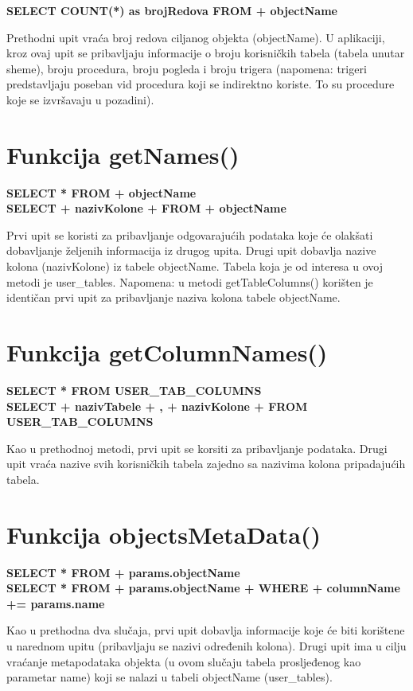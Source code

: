 \documentclass[12pt, a4paper]{report}
\theoremstyle{definition}
\begin{document}
	\textbf{SELECT COUNT(*) as brojRedova FROM + objectName}

Prethodni upit vraća broj redova ciljanog objekta (objectName). U aplikaciji, kroz ovaj upit se pribavljaju informacije o broju korisničkih tabela (tabela unutar sheme), broju procedura, broju pogleda i broju trigera (napomena: trigeri predstavljaju poseban vid procedura koji se indirektno koriste. To su procedure koje se izvršavaju u pozadini).

\section{Funkcija getNames()}

	\textbf{SELECT * FROM + objectName} \\
	\textbf{SELECT + nazivKolone + FROM + objectName}


Prvi upit se koristi za pribavljanje odgovarajućih podataka koje će olakšati dobavljanje željenih informacija iz drugog upita. Drugi upit dobavlja nazive kolona (nazivKolone) iz tabele objectName. Tabela koja je od interesa u ovoj metodi je user\_tables. 
Napomena: u metodi getTableColumns() korišten je identičan prvi upit za pribavljanje naziva kolona tabele objectName.

\section{Funkcija getColumnNames()}

\textbf{	SELECT * FROM USER\_TAB\_COLUMNS} \\
\textbf{SELECT + nazivTabele + , + nazivKolone + FROM USER\_TAB\_COLUMNS}

Kao u prethodnoj metodi, prvi upit se korsiti za pribavljanje podataka. Drugi upit vraća nazive svih korisničkih tabela zajedno sa nazivima kolona pripadajućih tabela.


\section{Funkcija objectsMetaData()}

	\textbf{SELECT * FROM + params.objectName} \\
	\textbf{SELECT * FROM + params.objectName + WHERE + columnName += params.name}

Kao u prethodna dva slučaja, prvi upit dobavlja informacije koje će biti korištene u narednom upitu (pribavljaju se nazivi određenih kolona). Drugi upit ima u cilju vraćanje metapodataka objekta (u ovom slučaju tabela prosljeđenog kao parametar name) koji se nalazi u tabeli objectName (user\_tables). 
\end{document}

